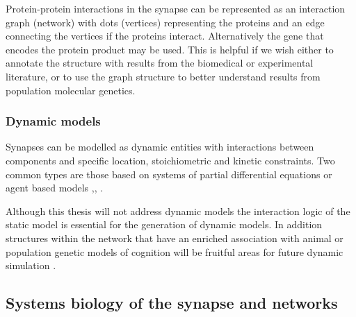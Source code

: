 Protein-protein interactions in the synapse can be represented as an interaction graph (network) with dots (vertices) representing the proteins and an edge connecting the vertices if the proteins interact. Alternatively the gene that encodes the protein product may be used. This is helpful if we wish either to annotate the structure with results from the biomedical or experimental literature, or to use the graph structure to better understand results from population molecular genetics. 

\subsubsection{Dynamic models}

Synapses can be modelled as dynamic entities with interactions between components and specific location, stoichiometric and kinetic constraints. Two common types are those based on systems of partial differential equations or agent based models \cite{sorokina2013simulator},\cite{sorokin2014rkappa}, \cite{walpole2013multiscale}.

Although this thesis will not address dynamic models the interaction logic of the static model is essential for the generation of dynamic models. In addition structures within the network that have an enriched association with animal or population genetic models of cognition will be fruitful areas for future dynamic simulation . 







\subsection{Systems biology of the synapse and networks}
\label{sec:networks_intro}

\label{sec:intro large scale structure of networks from paper}

